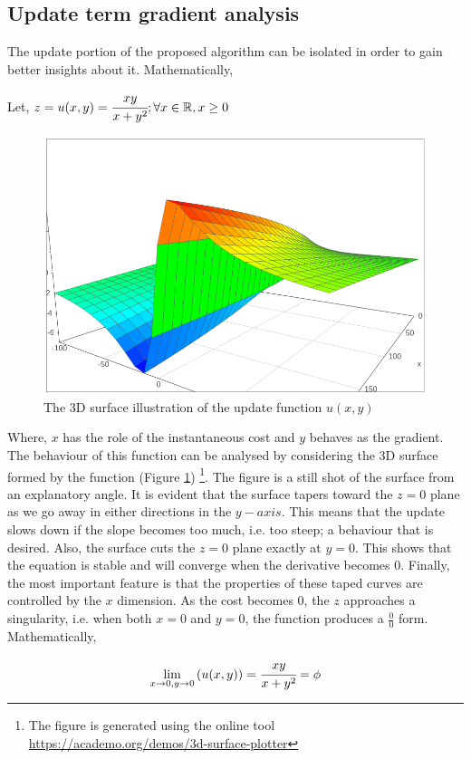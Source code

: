 \documentclass{article}
\begin{document}
\subsection{Update term gradient analysis}
The update portion of the proposed algorithm can be isolated in order to gain better insights about it. Mathematically,

\begin{center}
	Let, $z = u(x, y) = \cfrac{xy}{x + y^2}; \forall x \in \mathbb{R}, x \geq 0$
\end{center}

\begin{figure}[ht]
\begin{center}
\includegraphics[scale=1]{diagrams/update_term_surface.png}
\end{center}
\caption{The 3D surface illustration of the update function $u(x, y)$ }
\label{fig:figure_1}
\end{figure}


Where, $x$ has the role of the instantaneous cost and $y$ behaves as the gradient. The behaviour of this function can be analysed by considering the 3D surface formed by the function (Figure \ref{fig:figure_1}) \footnote{The figure is generated using the online tool \\ \url{https://academo.org/demos/3d-surface-plotter}}. The figure is a still shot of the surface from an explanatory angle. It is evident that the surface tapers toward the $z = 0$ plane as we go away in either directions in the $y-axis$. This means that the update slows down if the slope becomes too much, i.e. too steep; a behaviour that is desired. Also, the surface cuts the $z = 0$ plane exactly at $y = 0$. This shows that the equation is stable and will converge when the derivative becomes $0$. Finally, the most important feature is that the properties of these taped curves are controlled by the $x$ dimension. As the cost becomes $0$, the $z$ approaches a singularity, i.e. when both $x = 0$ and $y = 0$, the function produces a $\frac{0}{0}$ form. Mathematically,
\begin{center}
		$$\lim_{x \to 0, y \to 0} \left(u(x, y)\right) = \cfrac{xy}{x + y^2} = \phi$$
\end{center}
\end{document}
